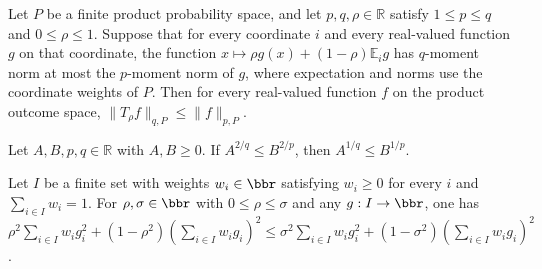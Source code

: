 \begin{theorem}
\leanok
{}
Let $P$ be a finite product probability space, and let $p,q,\rho\in\mathbb R$ satisfy
$1\le p\le q$ and $0\le\rho\le1$. Suppose that for every coordinate $i$ and every
real-valued function $g$ on that coordinate, the function $x\mapsto \rho
g(x)+(1-\rho)\mathbb E_i g$ has $q$-moment norm at most the $p$-moment norm of $g$,
where expectation and norms use the coordinate weights of $P$. Then for every
real-valued function $f$ on the product outcome space, $\|T_\rho f\|_{q,P}\le
\|f\|_{p,P}$.
\end{theorem}

\begin{theorem}
\leanok
{}
Let $A,B,p,q\in\mathbb R$ with $A,B\ge0$. If $A^{2/q}\le B^{2/p}$, then $A^{1/q}\le
B^{1/p}$.
\end{theorem}

\begin{theorem}
\leanok
{}
Let $I$ be a finite set with weights $w_i\in\bbr$ satisfying $w_i\ge0$ for every $i$ and
$\sum_{i\in I}w_i=1$. For $\rho,\sigma\in\bbr$ with $0\le\rho\le\sigma$ and any
$g:I\to\bbr$, one has $\rho^2\sum_{i\in I}w_i g_i^2+(1-\rho^2)(\sum_{i\in I}w_i
g_i)^2\le\sigma^2\sum_{i\in I}w_i g_i^2+(1-\sigma^2)(\sum_{i\in I}w_i g_i)^2$.
\end{theorem}

